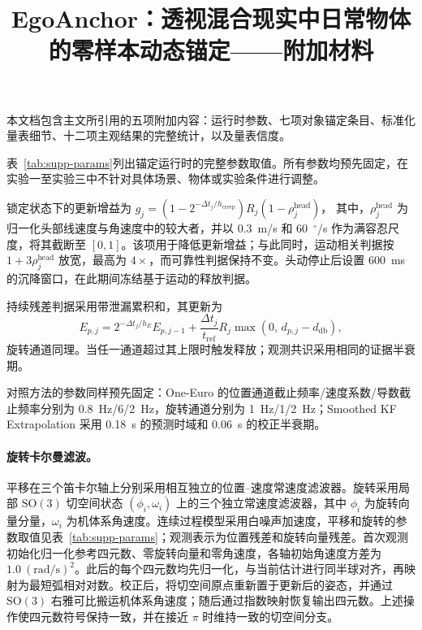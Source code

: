 \documentclass[review]{vgtc}
\title{EgoAnchor：透视混合现实中日常物体的零样本动态锚定——附加材料}
\author{}
\begin{document}
\maketitle
\label{sec:supp-params}

本文档包含主文所引用的五项附加内容：运行时参数、七项对象锚定条目、标准化量表细节、十二项主观结果的完整统计，以及量表信度。

表~\ref{tab:supp-params}列出锚定运行时的完整参数取值。所有参数均预先固定，在实验一至实验三中不针对具体场景、物体或实验条件进行调整。

锁定状态下的更新增益为
$g_j = (1 - 2^{-\Delta t_j / h_{\mathrm{creep}}}) R_j (1 - \rho_j^{\mathrm{head}})$，
其中，$\rho_j^{\mathrm{head}}$ 为归一化头部线速度与角速度中的较大者，并以 0.3~m/s 和 60~$^\circ$/s 作为满容忍尺度，将其截断至 $[0,1]$。该项用于降低更新增益；与此同时，运动相关判据按 $1+3\rho_j^{\mathrm{head}}$ 放宽，最高为 $4\times$，而可靠性判据保持不变。头动停止后设置 600~ms 的沉降窗口，在此期间冻结基于运动的释放判据。

持续残差判据采用带泄漏累积和，其更新为
\begin{equation}
E_{p,j} = 2^{-\Delta t_j / h_E} E_{p,j-1} + \frac{\Delta t_j}{t_{\mathrm{ref}}} R_j \max\!\left(0,\, d_{p,j} - d_{\mathrm{db}}\right),
\label{eq:supp-cusum}
\end{equation}
旋转通道同理。当任一通道超过其上限时触发释放；观测共识采用相同的证据半衰期。

对照方法的参数同样预先固定：One-Euro 的位置通道截止频率/速度系数/导数截止频率分别为 0.8~Hz/6/2~Hz，旋转通道分别为 1~Hz/1/2~Hz；Smoothed KF Extrapolation 采用 0.18~s 的预测时域和 0.06~s 的校正半衰期。

\paragraph{旋转卡尔曼滤波。}
平移在三个笛卡尔轴上分别采用相互独立的位置--速度常速度滤波器。旋转采用局部 $\mathrm{SO}(3)$ 切空间状态 $(\phi_i,\omega_i)$ 上的三个独立常速度滤波器，其中 $\phi_i$ 为旋转向量分量，$\omega_i$ 为机体系角速度。连续过程模型采用白噪声加速度，平移和旋转的参数取值见表~\ref{tab:supp-params}；观测表示为位置残差和旋转向量残差。首次观测初始化归一化参考四元数、零旋转向量和零角速度，各轴初始角速度方差为 $1.0~(\mathrm{rad}/\mathrm{s})^2$。此后的每个四元数均先归一化，与当前估计进行同半球对齐，再映射为最短弧相对对数。校正后，将切空间原点重新置于更新后的姿态，并通过 $\mathrm{SO}(3)$ 右雅可比搬运机体系角速度；随后通过指数映射恢复输出四元数。上述操作使四元数符号保持一致，并在接近 $\pi$ 时维持一致的切空间分支。
\end{document}
